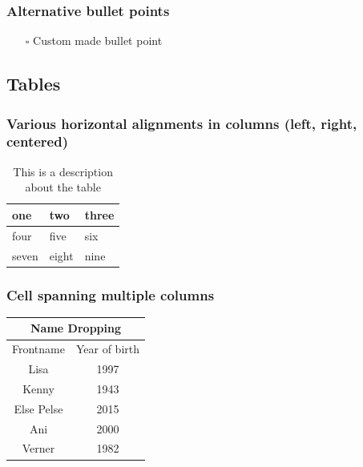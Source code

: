 \documentclass{article}
\begin{document}
            \subsubsection{Alternative bullet points}
            \begin{itemize}
                \item[$\square$]  Custom made bullet point
            \end{itemize}

        \newpage
        \subsection{Tables}
              \subsubsection{Various horizontal alignments in columns (left, right, centered)}
        
        \begin{table}[h!]
           
            \begin{tabularx}{0.8\textwidth} { 
                | >{\raggedright\arraybackslash}X 
                | >{\centering\arraybackslash}X 
                | >{\raggedleft\arraybackslash}X | }
                \hline
                one & two & three \\ 
                \hline
                four & five & six \\ 
                \hline
                seven & eight & nine \\ 
                \hline
                \end{tabularx}
            \centering
            \caption{This is a description about the table}
            \label{table:numbers}
        \end{table}

            \subsubsection{Cell spanning multiple columns}
            
            \begin{center}
            \begin{tabular}{ |c | c| }
                \hline 
                \multicolumn{2}{|c|}{Name Dropping} \\ [1ex]
                \hline 
                Frontname & Year of birth \\ [1ex]
                \hline
                Lisa &  1997 \\
                Kenny &  1943 \\
                Else Pelse & 2015 \\
                Ani & 2000 \\
                Verner & 1982 \\ [1ex]
                \hline
               \end{tabular}
            \end{center}
\end{document}
